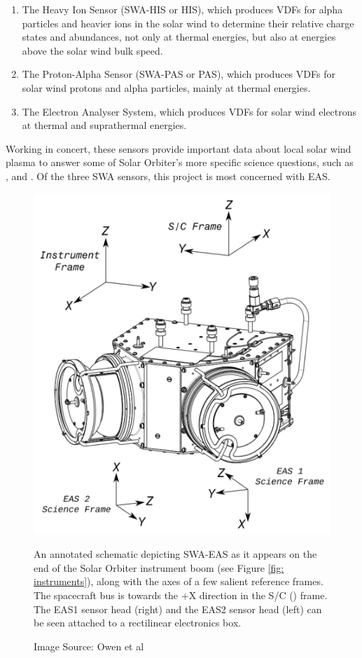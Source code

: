 \begin{enumerate}
    \item The Heavy Ion Sensor (SWA-HIS or HIS), which produces VDFs for alpha particles and heavier ions in the solar wind to determine their relative charge states and abundances, not only at thermal energies, but also at  energies above the solar wind bulk speed\cite{mason2023}.
    \item The Proton-Alpha Sensor (SWA-PAS or PAS), which produces VDFs for solar wind protons and alpha particles, mainly at thermal energies.
    \item The Electron Analyser System, which produces VDFs for solar wind electrons at thermal and suprathermal energies.
\end{enumerate}

Working in concert, these sensors provide important data about local solar wind plasma to answer some of Solar Orbiter's more specific science questions, such as ,  and \cite{owen2020}. Of the three SWA sensors, this project is most concerned with EAS. 
\\

\begin{figure}[h!]
    \centering
    \includegraphics[width=0.75\linewidth]{figures/SWA-EA Sensor Heads.png}
    \caption{An annotated schematic depicting SWA-EAS as it appears on the end of the Solar Orbiter instrument boom (see Figure \ref{fig: instruments}), along with the axes of a few salient reference frames\cite{owen2021}. The spacecraft bus is towards the +X direction in the S/C () frame. The EAS1 sensor head (right) and the EAS2 sensor head (left) can be seen attached to a rectilinear electronics box.}
    \caption*{Image Source: Owen et al\cite{owen2021}}
    \label{fig: EAS schematic}
\end{figure}

